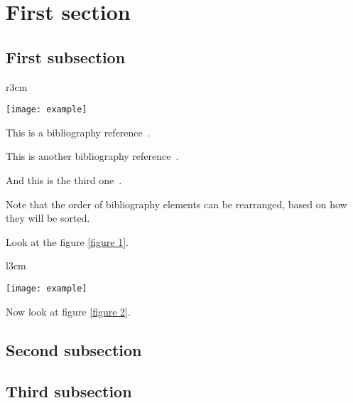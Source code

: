 \section{First section}

\subsection{First subsection}
\begin{wrapfigure}{r}{3cm} %
	\begin{center}
		\texttt{[image: example]}
	\end{center}
	\caption{Photo example}
	\label{figure 1}
\end{wrapfigure}
This is a bibliography reference~\cite{Little:1961:PQF:2772689.2772699}.

This is another bibliography reference~\cite{Kemeny}.

And this is the third one~\cite{Apache}.

Note that the order of bibliography elements can be rearranged, based on how they will be sorted.

\lipsum[1-2]

Look at the figure \ref{figure 1}. %
\lipsum[3]

\begin{wrapfigure}{l}{3cm}
	\begin{center}
		\texttt{[image: example]}
	\end{center}
	\caption{Photo example}
	\label{figure 2}
\end{wrapfigure}

Now look at figure \ref{figure 2}.
\lipsum[4-10]

\subsection{Second subsection}
\lipsum[2-3]
\lipsum[4]

\subsection{Third subsection}
\lipsum[5-7]
